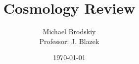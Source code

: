 


\title{Cosmology Review}
\date{\today}
\author{Michael Brodskiy\\ \small Professor: J. Blazek}



\maketitle

